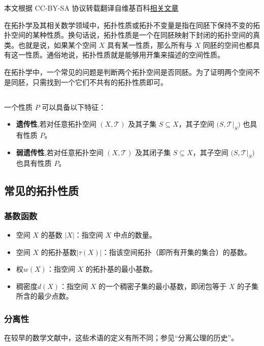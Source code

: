 
本文根据 CC-BY-SA 协议转载翻译自维基百科\href{https://en.wikipedia.org/wiki/Topological_property}{相关文章}

在拓扑学及其相关数学领域中，拓扑性质或拓扑不变量是指在同胚下保持不变的拓扑空间的某种性质。换句话说，拓扑性质是一个在同胚映射下封闭的拓扑空间的真类。也就是说，如果某个空间 $X$ 具有某一性质，那么所有与 $X$ 同胚的空间也都具有这一性质。通俗地说，拓扑性质就是能够用开集来描述的空间性质。

在拓扑学中，一个常见的问题是判断两个拓扑空间是否同胚。为了证明两个空间不是同胚，只需找到一个它们不共有的拓扑性质即可。
\subsection{ }
一个性质 $P$ 可以具备以下特征：
\begin{itemize}
\item \textbf{遗传性},若对任意拓扑空间 $(X, \mathcal{T})$ 及其子集 $S \subseteq X$，其子空间 $\bigl(S, \mathcal{T}|_S\bigr)$ 也具有性质 $P$。
\item \textbf{弱遗传性},若对任意拓扑空间 $(X, \mathcal{T})$ 及其闭子集 $S \subseteq X$，其子空间 $\bigl(S, \mathcal{T}|_S\bigr)$ 也具有性质 $P$。
\end{itemize}
\subsection{常见的拓扑性质}
\subsubsection{基数函数}
\begin{itemize}
\item 空间 $X$ 的基数 $|X|$：指空间 $X$ 中点的数量。
\item 空间 $X$ 的拓扑基数$|\tau(X)|$：指该空间拓扑（即所有开集的集合）的基数。
\item 权$w(X)$：指空间 $X$ 的拓扑基的最小基数。
\item 稠密度$d(X)$：指空间 $X$ 的一个稠密子集的最小基数，即闭包等于 $X$ 的子集所含的最少点数。
\end{itemize}
\subsubsection{分离性}
在较早的数学文献中，这些术语的定义有所不同；参见“分离公理的历史”。

